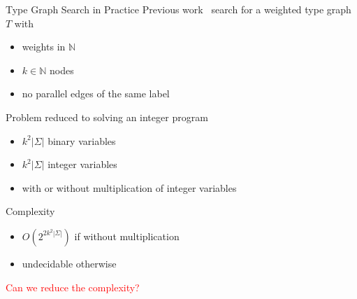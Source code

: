 \documentclass{beamer}
\begin{document}
\begin{frame}{Type Graph Search in Practice
   }
     Previous work~\cite{zantema2014termination,bruggink2014termination,bruggink2015proving} search for a weighted type graph \( T \) with
      \begin{itemize}
        \item weights in $\mathbb{N}$
        \item $k \in \mathbb{N}$ nodes
        \item no parallel edges of the same label 
      \end{itemize}
      Problem reduced to solving an integer program
                \begin{itemize}
                  \item $k^2|\Sigma|$ binary variables
                  \item $k^2|\Sigma|$ integer variables
                  \item with or without multiplication of integer variables
                \end{itemize} 
      Complexity 
              \begin{itemize}
                \item $O(2^{2k^2|\Sigma|})$ if without multiplication
                \item undecidable otherwise
              \end{itemize}


    \textcolor{red}{Can we reduce the complexity?}
\end{frame}
\end{document}

